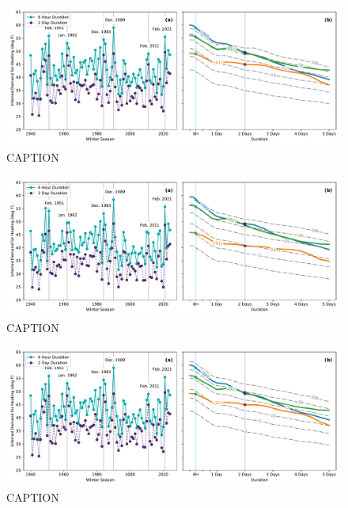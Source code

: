 \documentclass[12pt]{iopart}
\begin{document}
\begin{figure}
  \centering
  \includegraphics[width=\textwidth]{ERCOT_HDD_IDF_MLE_unweighted.pdf}
  \caption{CAPTION}\label{fig:idf_unweighted}
\end{figure}

\begin{figure}
  \centering
  \includegraphics[width=\textwidth]{ERCOT_HDD_IDF_plotpos_popweighted.pdf}
  \caption{CAPTION}\label{fig:idf_lmoments_weighted}
\end{figure}

\begin{figure}
  \centering
  \includegraphics[width=\textwidth]{ERCOT_HDD_IDF_plotpos_unweighted.pdf}
  \caption{CAPTION}\label{fig:idf_lmoments_unweighted}
\end{figure}
\end{document}
